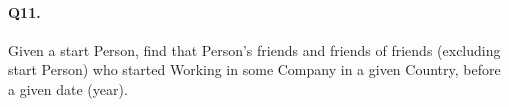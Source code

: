 \paragraph{Q11.}
Given a start Person, find that Person's friends and friends of friends
(excluding start Person) who started Working in some Company in a given
Country, before a given date (year).
